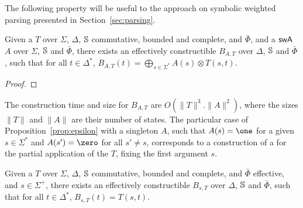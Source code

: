 


\noindent
The following property will be useful to the approach on
symbolic weighted parsing presented in Section~\ref{sec:parsing}.

\begin{proposition} \label{prop:epsilon}
Given a \SWT $T$ over $\Sigma$, $\Delta$,
$\mathbb{S}$ commutative, bounded and complete,
and $\bar\Phi$, %
and a $\textsf{swA}$ $A$ over $\Sigma$, $\mathbb{S}$ and $\bar\Phi$,
there exists an effectively constructible \SWA
$B_{A, T}$ over $\Delta$, $\mathbb{S}$ and $\bar\Phi$,
such that for all $t \in \Delta^*$,
$B_{A, T}(t) = \displaystyle\bigoplus_{s\in \Sigma^*} A(s) \otimes T(s, t)$.
\end{proposition}
%
\begin{proof}

\end{proof}

\noindent
The construction time and size for $B_{A, T}$ are $O(\| T \|^3 . \| A \|^2)$,
where the sizes $\| T \|$ and $\| A \|$ are their number of states.
%
The particular case of Proposition~\ref{prop:epsilon} with a singleton $A$,
\ie such that $A(s) = \one$ for a given $s \in \Sigma^*$
and $A(s') = \zero$ for all $s' \neq s$,
corresponds to a construction of a \SWA for the partial application of the \SWT $T$,
fixing the first argument $s$.
\begin{corollary} \label{cor:epsilon}
Given a \SWT $T$ over $\Sigma$, $\Delta$,
$\mathbb{S}$ commutative, bounded and complete,
and $\bar\Phi$ effective,
and $s \in \Sigma^+$,
there exists an effectively constructible \SWA
$B_{s, T}$ over $\Delta$, $\mathbb{S}$ and $\bar\Phi$,
such that for all $t \in \Delta^*$, $B_{s, T}(t) = T(s, t)$.
\end{corollary}









